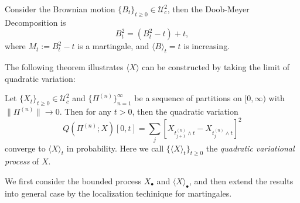 \begin{example}
Consider the Brownian motion $\{B_t\}_{t\ge0}\in\mathcal{U}_c^2$, then the Doob-Meyer Decomposition is
\[
B_t^2=(B_t^2-t)+t,
\]
where $M_t:=B_t^2-t$ is a martingale, and $\langle B\rangle_t=t$ is increasing.
\end{example}

The following theorem illustrates $\langle X\rangle$ can be constructed by taking the limit of quadratic variation:
\begin{theorem}\label{The:11:1}
Let $\{X_t\}_{t\ge0}\in\mathcal{U}_c^2$ and $\{\Pi^{(n)}\}_{n=1}^\infty$ be a sequence of partitions on $[0,\infty)$ with $\|\Pi^{(n)}\|\to0$.
Then for any $t>0$, then the quadratic variation
\[
Q(\Pi^{(n)};X)[0,t]=\sum_{j}[X_{t_{j+1}^{(n)}\land t}-X_{t_{j}^{(n)}\land t}]^2
\]
converge to $\langle X\rangle_t$ in probability.
Here we call $\{\langle X\rangle_t\}_{t\ge0}$ the \emph{quadratic variational process} of $X$.
\end{theorem}
We first consider the bounded process $X_{\bullet}$ and $\langle X\rangle_{\bullet}$, and then extend the results into general case by the localization techinique for martingales.
